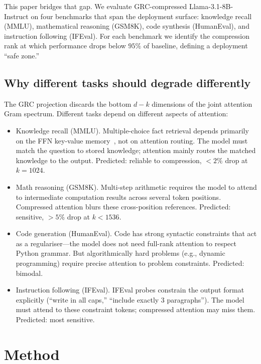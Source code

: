 \documentclass[11pt]{article}
\begin{document}
This paper bridges that gap.  We evaluate GRC-compressed
Llama-3.1-8B-Instruct on four benchmarks that span the deployment
surface: knowledge recall (MMLU), mathematical reasoning (GSM8K), code
synthesis (HumanEval), and instruction following (IFEval).  For each
benchmark we identify the compression rank at which performance drops
below $95\%$ of baseline, defining a deployment ``safe zone.''

\subsection{Why different tasks should degrade differently}

The GRC projection discards the bottom $d-k$ dimensions of the joint
attention Gram spectrum.  Different tasks depend on different aspects of
attention:

\begin{itemize}
\item Knowledge recall (MMLU).  Multiple-choice fact retrieval
      depends primarily on the FFN key-value memory~\cite{geva2021ffn},
      not on attention routing.  The model must match the question to
      stored knowledge; attention mainly routes the matched knowledge
      to the output.  Predicted: reliable to compression, $<2\%$ drop at
      $k{=}1024$.

\item Math reasoning (GSM8K).  Multi-step arithmetic requires
      the model to attend to intermediate computation results across
      several token positions.  Compressed attention blurs these
      cross-position references.  Predicted: sensitive, $>5\%$ drop
      at $k{<}1536$.

\item Code generation (HumanEval).  Code has strong syntactic
      constraints that act as a regulariser---the model does not need
      full-rank attention to respect Python grammar.  But algorithmically
      hard problems (e.g., dynamic programming) require precise
      attention to problem constraints.  Predicted: bimodal.

\item Instruction following (IFEval).  IFEval probes constrain
      the output format explicitly (``write in all caps,'' ``include
      exactly 3 paragraphs'').  The model must attend to these
      constraint tokens; compressed attention may miss them.  Predicted:
      most sensitive.
\end{itemize}

\section{Method}
\label{sec:method}
\end{document}
